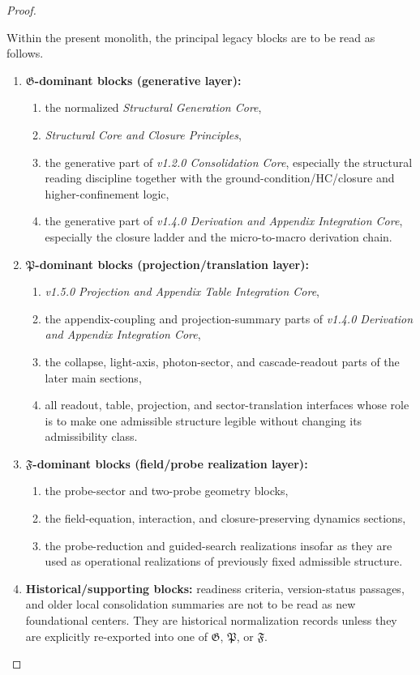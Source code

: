 \begin{proof}
\begin{definition}
\label{def:layer-assignment-legacy-core-blocks}
Within the present monolith, the principal legacy blocks are to be read as
follows.
\begin{enumerate}[leftmargin=2em,label=(L\arabic*)]
\item \textbf{$\mathfrak G$-dominant blocks (generative layer):}
\begin{enumerate}[leftmargin=2.5em,label=(\alph*)]
\item the normalized \emph{Structural Generation Core},
\item \emph{Structural Core and Closure Principles},
\item the generative part of \emph{v1.2.0 Consolidation Core}, especially the
structural reading discipline together with the ground-condition/HC/closure and
higher-confinement logic,
\item the generative part of \emph{v1.4.0 Derivation and Appendix Integration Core},
especially the closure ladder and the micro-to-macro derivation chain.
\end{enumerate}
\item \textbf{$\mathfrak P$-dominant blocks (projection/translation layer):}
\begin{enumerate}[leftmargin=2.5em,label=(\alph*)]
\item \emph{v1.5.0 Projection and Appendix Table Integration Core},
\item the appendix-coupling and projection-summary parts of \emph{v1.4.0 Derivation and Appendix Integration Core},
\item the collapse, light-axis, photon-sector, and cascade-readout parts of the later main sections,
\item all readout, table, projection, and sector-translation interfaces whose
role is to make one admissible structure legible without changing its
admissibility class.
\end{enumerate}
\item \textbf{$\mathfrak F$-dominant blocks (field/probe realization layer):}
\begin{enumerate}[leftmargin=2.5em,label=(\alph*)]
\item the probe-sector and two-probe geometry blocks,
\item the field-equation, interaction, and closure-preserving dynamics sections,
\item the probe-reduction and guided-search realizations insofar as they are
used as operational realizations of previously fixed admissible structure.
\end{enumerate}
\item \textbf{Historical/supporting blocks:} readiness criteria, version-status
passages, and older local consolidation summaries are not to be read as new
foundational centers. They are historical normalization records unless they are
explicitly re-exported into one of $\mathfrak G$, $\mathfrak P$, or
$\mathfrak F$.
\end{enumerate}
\end{definition}


\end{proof}
